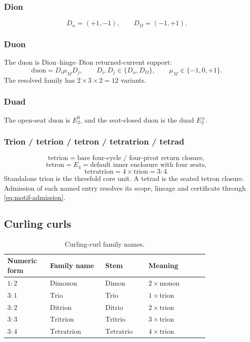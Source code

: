 \subsubsection{Dion}
\label{app:cc-dion}
\[
D_\alpha=(+1,-1),
\qquad
D_\Omega=(-1,+1).
\]

\subsubsection{Duon}
\label{app:cc-duon-duad-cycle}
The duon is Dion--hinge--Dion returned-current support:
\[
\mathrm{duon}=D_i\mu_M D_j,
\qquad
D_i,D_j\in\{D_\alpha,D_\Omega\},
\qquad
\mu_M\in\{-1,0,+1\}.
\]
The resolved family has \(2\times3\times2=12\) variants.

\subsubsection{Duad}
\label{app:cc-duad}
The open-seat duon is \(E_2^0\), and the seat-closed duon is the duad \(E_2^{\pm}\).

\subsubsection{Trion / tetrion / tetron / tetratrion / tetrad}
\label{app:cc-tetrion-tetron-tetratrion}
\[
\mathrm{tetrion}=\text{bare four-cycle / four-pivot return closure},
\]
\[
\mathrm{tetron}=E_4=\text{default inner enclosure with four seats},
\]
\[
\mathrm{tetratrion}=4\times\mathrm{trion}=3:4.
\]
Standalone trion is the threefold core unit. A tetrad is the seated tetron closure. Admission of each named entry resolves its scope, lineage and certificate through \eqref{eq:motif-admission}.

\subsection{Curling curls}
\label{app:cc-families}

\begin{table}[H]
\centering
\caption{Curling-curl family names.}
\label{tab:cc-families}
\renewcommand{\arraystretch}{1.18}
\begin{tabular}{@{}>{\raggedright\arraybackslash}p{0.16\linewidth}
                >{\raggedright\arraybackslash}p{0.23\linewidth}
                >{\raggedright\arraybackslash}p{0.18\linewidth}
                >{\raggedright\arraybackslash}p{0.25\linewidth}@{}}
\toprule
Numeric form & Family name & Stem & Meaning \\
\midrule
\(1:2\) & \(\mathrm{Dimonon}\) & \(\mathrm{Dimon}\) & \(2\times\mathrm{monon}\) \\
\(3:1\) & \(\mathrm{Trio}\) & \(\mathrm{Trio}\) & \(1\times\mathrm{trion}\) \\
\(3:2\) & \(\mathrm{Ditrion}\) & \(\mathrm{Ditrio}\) & \(2\times\mathrm{trion}\) \\
\(3:3\) & \(\mathrm{Tritrion}\) & \(\mathrm{Tritrio}\) & \(3\times\mathrm{trion}\) \\
\(3:4\) & \(\mathrm{Tetratrion}\) & \(\mathrm{Tetratrio}\) & \(4\times\mathrm{trion}\) \\
\bottomrule
\end{tabular}
\end{table}


